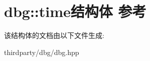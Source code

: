 \hypertarget{structdbg_1_1time}{}\section{dbg\+:\+:time结构体 参考}
\label{structdbg_1_1time}


该结构体的文档由以下文件生成\+:\begin{DoxyCompactItemize}
\item 
thirdparty/dbg/dbg.\+hpp\end{DoxyCompactItemize}
